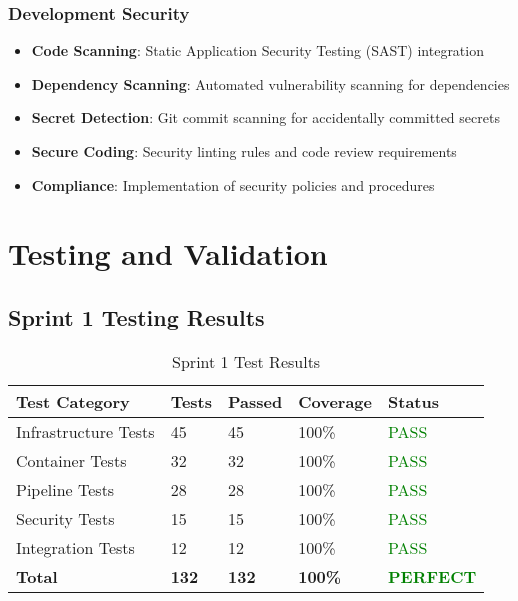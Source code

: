 \subsubsection{Development Security}

\begin{itemize}
    \item \textbf{Code Scanning}: Static Application Security Testing (SAST) integration
    \item \textbf{Dependency Scanning}: Automated vulnerability scanning for dependencies
    \item \textbf{Secret Detection}: Git commit scanning for accidentally committed secrets
    \item \textbf{Secure Coding}: Security linting rules and code review requirements
    \item \textbf{Compliance}: Implementation of security policies and procedures
\end{itemize}

\section{Testing and Validation}

\subsection{Sprint 1 Testing Results}

\begin{table}[H]
\centering
\caption{Sprint 1 Test Results}
\begin{tabular}{|p{3cm}|p{2cm}|p{2cm}|p{3cm}|p{2cm}|}
\hline
\textbf{Test Category} & \textbf{Tests} & \textbf{Passed} & \textbf{Coverage} & \textbf{Status} \\
\hline
Infrastructure Tests & 45 & 45 & 100\% & \textcolor{green}{PASS} \\
\hline
Container Tests & 32 & 32 & 100\% & \textcolor{green}{PASS} \\
\hline
Pipeline Tests & 28 & 28 & 100\% & \textcolor{green}{PASS} \\
\hline
Security Tests & 15 & 15 & 100\% & \textcolor{green}{PASS} \\
\hline
Integration Tests & 12 & 12 & 100\% & \textcolor{green}{PASS} \\
\hline
\textbf{Total} & \textbf{132} & \textbf{132} & \textbf{100\%} & \textcolor{green}{\textbf{PERFECT}} \\
\hline
\end{tabular}
\end{table}

